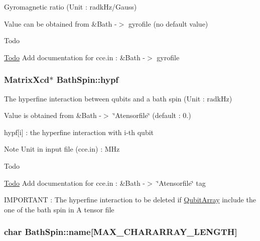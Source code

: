 Gyromagnetic ratio (Unit \-: radk\-Hz/\-Gauss) 

Value can be obtained from \&Bath -\/$>$ gyrofile (no default value) \begin{DoxyRefDesc}{Todo}
\item[\hyperlink{todo__todo000002}{Todo}]Add documentation for cce.\-in \-: \&Bath -\/$>$ gyrofile \end{DoxyRefDesc}
\hypertarget{structBathSpin_aad4ead2e39f4ae27fab5701662e7ee27}{
\subsubsection[{hypf}]{\setlength{\rightskip}{0pt plus 5cm}Matrix\-Xcd$\ast$ Bath\-Spin\-::hypf}}\label{structBathSpin_aad4ead2e39f4ae27fab5701662e7ee27}


The hyperfine interaction between qubits and a bath spin (Unit \-: radk\-Hz) 

Value is obtained from \&Bath -\/$>$ \char`\"{}\-Atensorfile\char`\"{} (default \-: 0.)
\begin{DoxyItemize}
\item hypf\mbox{[}i\mbox{]} \-: the hyperfine interaction with i-\/th qubit \begin{DoxyNote}{Note}
Unit in input file (cce.\-in) \-: M\-Hz 
\end{DoxyNote}
\begin{DoxyRefDesc}{Todo}
\item[\hyperlink{todo__todo000008}{Todo}]Add documentation for cce.\-in \-: \&Bath -\/$>$ \char`\"{}\-Atensorfile\char`\"{} tag 

I\-M\-P\-O\-R\-T\-A\-N\-T \-: The hyperfine interaction to be deleted if \hyperlink{structQubitArray}{Qubit\-Array} include the one of the bath spin in A tensor file \end{DoxyRefDesc}

\end{DoxyItemize}\hypertarget{structBathSpin_a2158c37aefcd8093520106945f5f7463}{
\subsubsection[{name}]{\setlength{\rightskip}{0pt plus 5cm}char Bath\-Spin\-::name\mbox{[}M\-A\-X\-\_\-\-C\-H\-A\-R\-A\-R\-R\-A\-Y\-\_\-\-L\-E\-N\-G\-T\-H\mbox{]}}}\label{structBathSpin_a2158c37aefcd8093520106945f5f7463}



